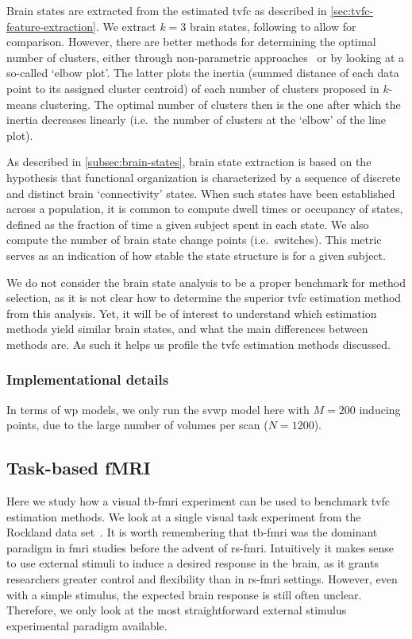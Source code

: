 Brain states are extracted from the estimated \gls{tvfc} as described in \cref{sec:tvfc-feature-extraction}.
We extract $k = 3$ brain states, following \textcite{Choe2017} to allow for comparison.
However, there are better methods for determining the optimal number of clusters, either through non-parametric approaches~\parencite[see e.g.][]{Nielsen2017, Taghia2017} or by looking at a so-called `elbow plot'.
The latter plots the inertia (summed distance of each data point to its assigned cluster centroid) of each number of clusters proposed in $k$-means clustering.
The optimal number of clusters then is the one after which the inertia decreases linearly (i.e.~the number of clusters at the `elbow' of the line plot).

As described in \cref{subsec:brain-states}, brain state extraction is based on the hypothesis that functional organization is characterized by a sequence of discrete and distinct brain `connectivity' states.
When such states have been established across a population, it is common to compute dwell times or occupancy of states, defined as the fraction of time a given subject spent in each state.
We also compute the number of brain state change points (i.e.~switches).
This metric serves as an indication of how stable the state structure is for a given subject.

We do not consider the brain state analysis to be a proper benchmark for method selection, as it is not clear how to determine the superior \gls{tvfc} estimation method from this analysis.
Yet, it will be of interest to understand which estimation methods yield similar brain states, and what the main differences between methods are.
As such it helps us profile the \gls{tvfc} estimation methods discussed.

\subsubsection{Implementational details}

In terms of \gls{wp} models, we only run the \gls{svwp} model here with $M = 200$ inducing points, due to the large number of volumes per scan ($N = 1200$).

\subsection{Task-based fMRI}\label{subsec:rockland-methodology}

Here we study how a visual \gls{tb-fmri} experiment can be used to benchmark \gls{tvfc} estimation methods.
We look at a single visual task experiment from the Rockland data set~\parencite{Nooner2012}.
%
It is worth remembering that \gls{tb-fmri} was the dominant paradigm in \gls{fmri} studies before the advent of \gls{rs-fmri}.
Intuitively it makes sense to use external stimuli to induce a desired response in the brain, as it grants researchers greater control and flexibility than in \gls{rs-fmri} settings.
However, even with a simple stimulus, the expected brain response is still often unclear.
Therefore, we only look at the most straightforward external stimulus experimental paradigm available.

